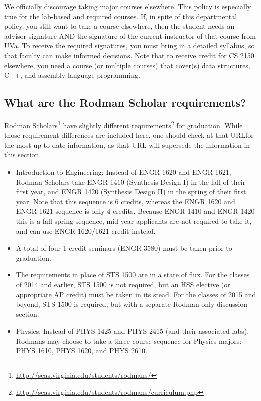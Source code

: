 \documentclass[10pt,letter,twocolumn]{book}
\newenvironment{itemlist}{
\begin{itemize}
\setlength{\itemsep}{0pt}
\setlength{\parskip}{0pt}}
{\end{itemize}}
\newcommand{\myurl}[1]{\footnote{\scriptsize\url{#1}}}
\newcommand{\myurlremember}[2]{\footnote{\scriptsize\url{#2}}\newcounter{#1}\setcounter{#1}{\value{footnote}}}
\newcommand{\myurlrecall}[1]{\footnotemark[\value{#1}]}
\begin{document}
We officially discourage taking major courses elsewhere. This policy
is especially true for the lab-based and required courses. If, in
spite of this departmental policy, you still want to take a course
elsewhere, then the student needs an advisor signature AND the
signature of the current instructor of that course from UVa. To
receive the required signatures, you must bring in a detailed
syllabus, so that faculty can make informed decisions. Note that to
receive credit for CS 2150 elsewhere, you need a course (or
multiple courses) that cover(s) data structures, C++, and assembly
language programming.

\subsection{What are the Rodman Scholar requirements?}

Rodman Scholars\myurl{http://seas.virginia.edu/students/rodmans/} have
slightly different
requirements\myurlremember{rodmanreqs}{http://seas.virginia.edu/students/rodmans/curriculum.php}
for graduation.  While those requirement differences are included
here, one should check at that URL\myurlrecall{rodmanreqs} for the
most up-to-date information, as that URL will supersede the
information in this section.

\begin{itemlist}
\item Introduction to Engineering: Instead of ENGR 1620 and ENGR 1621,
  Rodman Scholars take ENGR 1410 (Synthesis Design I) in the fall of
  their first year, and ENGR 1420 (Synthesis Design II) in the spring
  of their first year.  Note that this sequence is 6 credits, whereas
  the ENGR 1620 and ENGR 1621 sequence is only 4 credits.  Because
  ENGR 1410 and ENGR 1420 this is a fall-spring sequence, mid-year
  applicants are not required to take it, and can use ENGR 1620/1621
  credit instead.
\item A total of four 1-credit seminars (ENGR 3580) must be taken
  prior to graduation.
\item The requirements in place of STS 1500 are in a state of flux.
  For the classes of 2014 and earlier, STS 1500 is not required, but
  an HSS elective (or appropriate AP credit) must be taken in its
  stead.  For the classes of 2015 and beyond, STS 1500 is required,
  but with a separate Rodman-only discussion section.
\item Physics: Instead of PHYS 1425 and PHYS 2415 (and their
  associated labs), Rodmans may choose
  to take a three-course sequence for Physics majors: PHYS 1610, PHYS
  1620, and PHYS 2610.
\end{itemlist}
\end{document}
